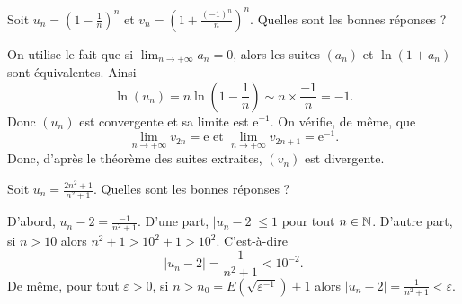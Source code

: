 \begin{question}

Soit $\displaystyle u_n=\left(1-\frac{1}{n}\right)^n$ et $\displaystyle v_n=\left(1+\frac{(-1)^{n}}{n}\right)^n$. Quelles sont les bonnes réponses ?
\begin{answers}  
\end{answers}
\begin{explanations}
On utilise le fait que si $\displaystyle \lim _{n\to +\infty}a_n=0$, alors les suites $(a_n)$ et $\ln (1+a_n)$ sont équivalentes. Ainsi 
$$\ln (u_n)=n\ln \left(1-\frac{1}{n}\right)\sim n\times \frac{-1}{n}=-1.$$
Donc $(u_n)$ est convergente et sa limite est $\mathrm{e}^{-1}$. On vérifie, de même, que
$$\displaystyle \lim _{n\to +\infty}v_{2n}=\mathrm{e}\mbox{ et }\lim _{n\to +\infty}v_{2n+1}=\mathrm{e}^{-1}.$$
Donc, d'après le théorème des suites extraites, $(v_n)$ est divergente.
\end{explanations}
\end{question}



\begin{question}

Soit $\displaystyle u_n=\frac{2n^2+1}{n^2+1}$. Quelles sont les bonnes réponses ?
\begin{answers}
\end{answers}
\begin{explanations}
D'abord, $\displaystyle u_n-2=\frac{-1}{n^2+1}$. D'une part, $\displaystyle |u_n-2|\leq 1$ pour tout $n\in \mathbb{N}$. D'autre part, si $n>10$ alors $\displaystyle n^2+1>10^2+1>10^2$. C'est-à-dire
$$|u_n-2|=\frac{1}{n^2+1}<10^{-2}.$$
De même, pour tout $\varepsilon >0$, si $n>n_0=E\left(\sqrt{\varepsilon ^{-1}}\right)+1$ alors $\displaystyle |u_n-2|=\frac{1}{n^2+1}<\varepsilon$.
\end{explanations}
\end{question}



